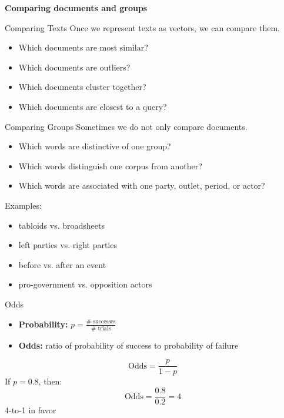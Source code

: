 \documentclass[11pt,aspectratio=43]{beamer}
\begin{document}
\begin{frame}[plain]
  \centering
  \vfill
  {\LARGE\bfseries
   Comparing documents and groups \par}
  \vfill
\end{frame}

\begin{frame}{Comparing Texts}
Once we represent texts as vectors, we can compare them.
\begin{itemize}
\item Which documents are most similar?
\item Which documents are outliers?
\item Which documents cluster together?
\item Which documents are closest to a query?
\end{itemize}
\end{frame}

\begin{frame}{Comparing Groups}
Sometimes we do not only compare documents.
\begin{itemize}
\item Which words are distinctive of one group?
\item Which words distinguish one corpus from another?
\item Which words are associated with one party, outlet, period, or actor?
\end{itemize}
Examples:
\begin{itemize}
\item tabloids vs. broadsheets
\item left parties vs. right parties
\item before vs. after an event
\item pro-government vs. opposition actors
\end{itemize}
\end{frame}

\begin{frame}{Odds}
\begin{itemize}
\item \textbf{Probability:} $p=\frac{\#\text{ successes}}{\#\text{ trials}}$
\item \textbf{Odds:} ratio of probability of success to probability of failure
\end{itemize}
\[
\mathrm{Odds}=\frac{p}{1-p}
\]
If $p=0.8$, then:
\[
\mathrm{Odds}=\frac{0.8}{0.2}=4
\]
4-to-1 in favor
\end{frame}
\end{document}
